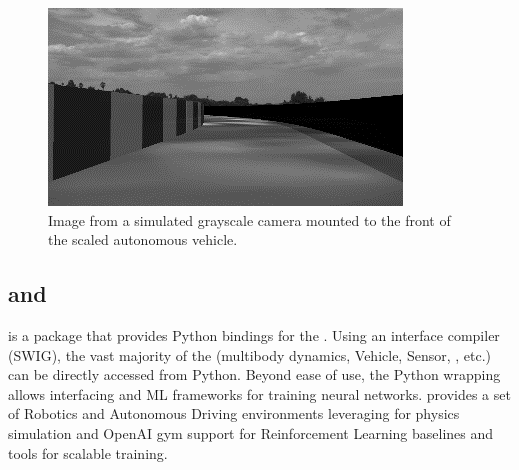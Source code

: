 \begin{figure}
	\centering
	\includegraphics[width=0.8\columnwidth]{Figs/AV-greyscale.png}
	\caption{{\small Image from a simulated grayscale camera mounted to the front of the scaled autonomous vehicle.}}   
	\label{fig:avgreyscale}
\end{figure}


\subsection{\pychrono{} and \gymchrono{}}\label{s:pyandgym}

\pychrono{} is a package that provides Python bindings for the \chrono{} \api{}. Using an interface compiler (SWIG), the vast majority of the \chrono{} \api{} (multibody dynamics, Vehicle, Sensor, \fea{}, etc.) can be directly accessed from Python. Beyond ease of use, the Python wrapping allows interfacing \chrono{} and ML frameworks for training neural networks. \gymchrono{} provides a set of Robotics and Autonomous Driving environments leveraging \chrono{} for physics simulation and OpenAI gym support for Reinforcement Learning baselines and tools for scalable training.


\subsection{\synchrono{}}\label{s:synchrono}

